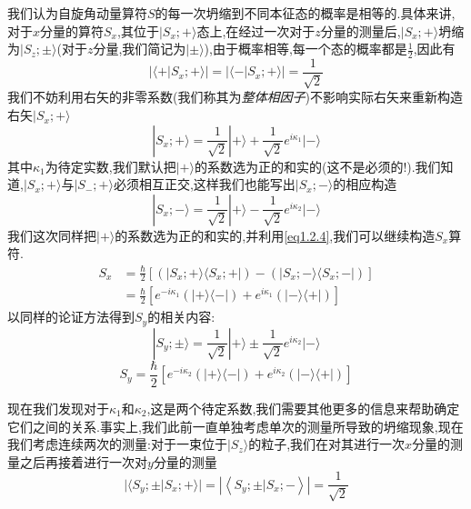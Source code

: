 我们认为自旋角动量算符$S$的每一次坍缩到不同本征态的概率是相等的.具体来讲,对于$x$分量的算符$S_x$,其位于$|S_x;+\rangle$态上,在经过一次对于$z$分量的测量后,$|S_x;+\rangle$坍缩为$|S_z;\pm\rangle$(对于$z$分量,我们简记为$|\pm\rangle$),由于概率相等,每一个态的概率都是$\frac12$,因此有
\begin{equation}
	|\langle+| S_x ; +\rangle|=|\langle-| S_x ; +\rangle|=\frac{1}{\sqrt{2}}
\end{equation}
我们不妨利用右矢的非零系数(我们称其为\textit{整体相因子})不影响实际右矢来重新构造右矢$|S_x;+\rangle$
\begin{equation}
	|S_x;+\rangle=\frac{1}{\sqrt{2}}|+\rangle+\frac{1}{\sqrt{2}}e^{i\kappa_1} |-\rangle 
\end{equation}
其中$\kappa_1$为待定实数,我们默认把$|+\rangle$的系数选为正的和实的(这不是必须的!).我们知道,$|S_x;+\rangle$与$|S_-;+\rangle$必须相互正交,这样我们也能写出$|S_x;-\rangle$的相应构造
\begin{equation}
	|S_x;-\rangle=\frac{1}{\sqrt{2}}|+\rangle-\frac{1}{\sqrt{2}}e^{i\kappa_2} |-\rangle 
\end{equation}
我们这次同样把$|+\rangle$的系数选为正的和实的,并利用\ref{eq1.2.4},我们可以继续构造$S_x$算符.
\begin{equation}
	\begin{aligned}S_{x}&=\frac{\hbar}{2}[(| S_{x} ; +\rangle\langle S_{x} ; +|)-(| S_{x} ; -\rangle\langle S_{x} ; -|) ]\\&=\frac{\hbar}{2}[e^{-i\kappa_{1}}\left(|+\rangle\langle-|\right)+e^{i\kappa_{1}}\left(|-\rangle\langle+|\right)]\end{aligned}
\end{equation}
以同样的论证方法得到$S_y$的相关内容:
\begin{equation}
	|S_{y};\pm\rangle=\frac{1}{\sqrt{2}}|+\rangle\pm\frac{1}{\sqrt{2}}e^{i\kappa_{2}} |-\rangle
\end{equation}
\begin{equation}
	S_{y}=\frac{\hbar}{2}[e^{-i\kappa_{2}}(|+\rangle\langle-|)+e^{i\kappa_{2}}(|-\rangle\langle+|)]
\end{equation}

现在我们发现对于$\kappa_1$和$\kappa_2$,这是两个待定系数,我们需要其他更多的信息来帮助确定它们之间的关系.事实上,我们此前一直单独考虑单次的测量所导致的坍缩现象,现在我们考虑连续两次的测量:对于一束位于$|S_z\rangle$的粒子,我们在对其进行一次$x$分量的测量之后再接着进行一次对$y$分量的测量
\begin{equation}
	| \langle {{S}_{y}; \pm \left| {{S}_{x}; + }\rangle\right| = \left| \left\langle {{S}_{y}; \pm }|{S}_{x}; - \right\rangle \right| }= \frac{1}{\sqrt{2}}
\end{equation}

